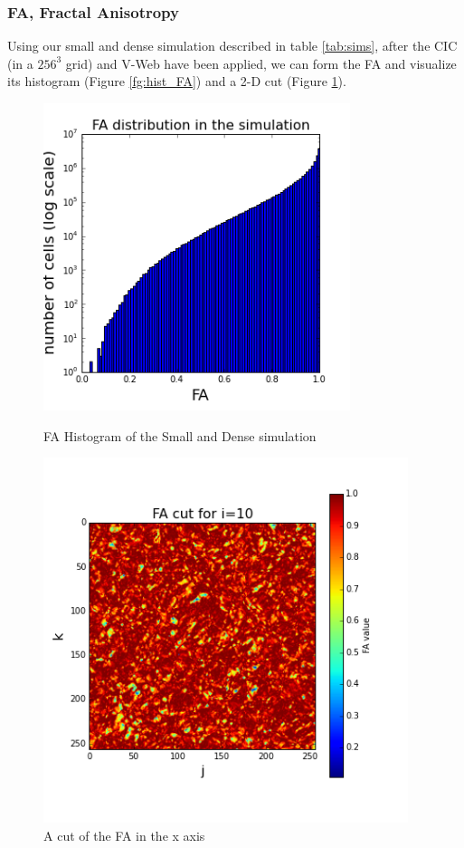 \documentclass[12pt]{article}
\begin{document}
\subsubsection{FA, Fractal Anisotropy}
Using our small and dense simulation described in table \ref{tab:sims}, after the CIC (in a $256^{3}$ grid) and V-Web have been applied, we can form the FA and visualize its histogram (Figure \ref{fg:hist_FA}) and a 2-D cut (Figure \ref{fg:cut_FA}).
\begin{figure}[ht]
\centering
\begin{minipage}{.5\textwidth}
  \centering
  \includegraphics[width=0.8\textwidth]{simulation/FA_hist_sim.png}
  \caption{FA Histogram of the Small and Dense simulation}
\label{fg:hist_FA}
\end{minipage}%
\begin{minipage}{.5\textwidth}
  \centering
  \includegraphics[width=0.95\textwidth]{simulation/FA_cut_i_10.png}
  \caption{A cut of the FA in the x axis}
\label{fg:cut_FA}
\end{minipage}
\end{figure}
\FloatBarrier
\end{document}

